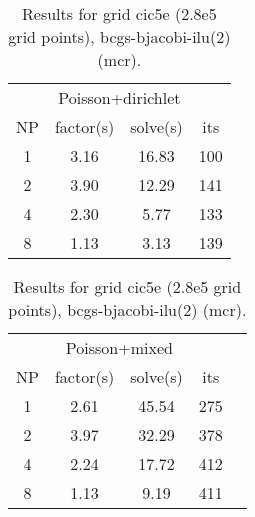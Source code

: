 \begin{table}[hbt]
\begin{center}\footnotesize
\begin{tabular}{|c|c|c|c|} \hline 
\multicolumn{4}{|c|}{Poisson+dirichlet} \\
  NP   & factor(s)  & solve(s) &  its    \\ \hline 
  1   &       3.16  &     16.83 & 100 \\
  2   &       3.90  &     12.29 & 141 \\
  4   &       2.30  &      5.77 & 133 \\
  8   &       1.13  &      3.13 & 139 \\
\hline
\end{tabular}		
\qquad
\begin{tabular}{|c|c|c|c|l|} \hline 
\multicolumn{4}{|c|}{Poisson+mixed} \\
  NP   & factor(s)  & solve(s) &  its    \\ \hline
  1   &       2.61  &     45.54 & 275 \\
  2   &       3.97  &     32.29 & 378 \\
  4   &       2.24  &     17.72 & 412 \\
  8   &       1.13  &      9.19 & 411 \\
\hline
\end{tabular}
\end{center}		
\caption{Results for grid cic5e (2.8e5 grid points), bcgs-bjacobi-ilu(2) (mcr).}
 \label{tab:cic5e.bcgs.bjacobi.preonly.ilu2} 
\end{table}


% 

